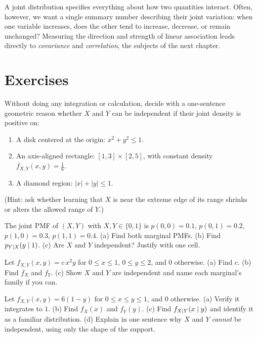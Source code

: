 A joint distribution specifies everything about how two quantities interact.
Often, however, we want a single summary number describing their joint variation:
when one variable increases, does the other tend to increase, decrease, or remain unchanged?
Measuring the direction and strength of linear association leads directly to \emph{covariance}
and \emph{correlation}, the subjects of the next chapter.

\section{Exercises}
\label{ch13:exercises}

\begin{exercise}
\label{ch13:ex-mental-indep}
Without doing any integration or calculation, decide with a one-sentence geometric
reason whether $X$ and $Y$ can be independent if their joint density is positive
on:
\begin{enumerate}[label=(\alph*)]
  \item A disk centered at the origin: $x^2 + y^2 \le 1$.
  \item An axis-aligned rectangle: $[1,3] \times [2,5]$, with constant density $f_{X,Y}(x,y) = \tfrac{1}{6}$.
  \item A diamond region: $|x| + |y| \le 1$.
\end{enumerate}
(Hint: ask whether learning that $X$ is near the extreme edge of its range shrinks
or alters the allowed range of $Y$.)
\end{exercise}

\begin{exercise}
\label{ch13:ex-table}
The joint PMF of $(X,Y)$ with $X,Y\in\{0,1\}$ is
$p(0,0)=0.1$, $p(0,1)=0.2$, $p(1,0)=0.3$, $p(1,1)=0.4$.
(a) Find both marginal PMFs. (b) Find $p_{Y\mid X}(y\mid 1)$. (c) Are $X$ and
$Y$ independent? Justify with one cell.
\end{exercise}

\begin{exercise}
\label{ch13:ex-normalize}
Let $f_{X,Y}(x,y) = c\,x^2 y$ for $0\le x\le 1$, $0\le y\le 2$, and $0$
otherwise. (a) Find $c$. (b) Find $f_X$ and $f_Y$. (c) Show $X$ and $Y$ are
independent and name each marginal's family if you can.
\end{exercise}

\begin{exercise}
\label{ch13:ex-coupled-ex}
Let $f_{X,Y}(x,y) = 6(1-y)$ for $0\le x\le y\le 1$, and $0$ otherwise.
(a) Verify it integrates to $1$. (b) Find $f_X(x)$ and $f_Y(y)$. (c) Find
$f_{X\mid Y}(x\mid y)$ and identify it as a familiar distribution.
(d) Explain in one sentence why $X$ and $Y$ \emph{cannot} be independent, using
only the shape of the support.
\end{exercise}

